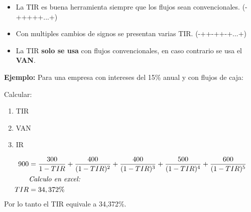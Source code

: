 \documentclass{templateNote}
\begin{document}
\begin{tcolorbox}[colback=purple!5!white,colframe=purple!75!black,title=Importante]
    \begin{itemize}
        \item La TIR es buena herramienta siempre que los flujos sean convencionales. (-+++++...+)
        \item Con multiples cambios de signos se presentan varias TIR. (-++-++-+...+)
        \item La TIR \textbf{solo se usa} con flujos convencionales, en caso contrario se usa el \textbf{VAN}.
    \end{itemize}
\end{tcolorbox}

\textbf{Ejemplo:} Para una empresa con intereses del 15\% anual y con flujos de caja:

\begin{center}
\end{center}
Calcular:
\begin{enumerate}[label=\alph*)]
    \item TIR
    \item VAN
    \item IR
\end{enumerate}

\begin{align*}
    900 &= \frac{300}{1-TIR} + \frac{400}{(1-TIR)^2} + \frac{400}{(1-TIR)^3} + \frac{500}{(1-TIR)^4} + \frac{600}{(1-TIR)^5} \\
    &\textnormal{\textit{Calculo en excel:}}\\
    TIR &= 34,372\%
\end{align*}
Por lo tanto el TIR equivale a 34,372\%.
\end{document}
